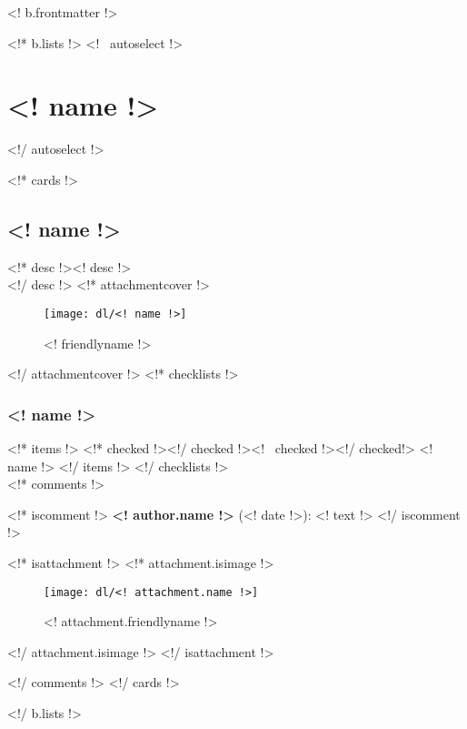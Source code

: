 



\renewcommand{\chaptertitle}{FTC 4290 - "High PHidelity"}
\renewcommand{\today}{FTC Notebook 2014-2015}
\renewcommand{\sectiontitle}{Revision <! b.lastmodified !>}

\setcounter{chapter}{1}
\setcounter{page}{1}
\renewcommand\contentsname{Table of Contents}
\setcounter{tocdepth}{2}
\renewcommand{\sectiontitle}{Table of Contents}
\tableofcontents
\renewcommand{\thesection}{}
\cleardoublepage

<! b.frontmatter !>

\cleardoublepage
\color{black}

\cleardoublepage
\renewcommand{\chaptertitle}{Engineering Section}
\renewcommand{\today}{\mbox{}}
\renewcommand{\sectiontitle}{Directly from Trello}

<!* b.lists !>
<!~ autoselect !>\section{<! name !>}<!/ autoselect !>

<!* cards !>
\subsection{<! name !>}
<!* desc !><! desc !>\\<!/ desc !>
<!* attachmentcover !>
\begin{figure}[H]
  \centering
  \texttt{[image: dl/<! name !>]}
  \caption[]{<! friendlyname !>}
  \label{fig:<! name !>}
\end{figure}
<!/ attachmentcover !>
<!* checklists !>
\subsubsection{<! name !>}
<!* items !>
<!* checked !>\boxchecked<!/ checked !><!~ checked !>\boxunchecked<!/ checked!> <! name !>
<!/ items !>
<!/ checklists !>\mbox{}\\


<!* comments !>

<!* iscomment !>
{\bf <! author.name !>} {\color{darkgray} (<! date !>)}: <! text !>
<!/ iscomment !>

<!* isattachment !>
<!* attachment.isimage !>
\begin{figure}[H]
  \centering
  \texttt{[image: dl/<! attachment.name !>]}
  \caption[]{<! attachment.friendlyname !>}
  \label{fig:<! attachment.name !>}
\end{figure}
<!/ attachment.isimage !>
<!/ isattachment !>

<!/ comments !>
\newpage
\clearpage
<!/ cards !>

<!/ b.lists !>

